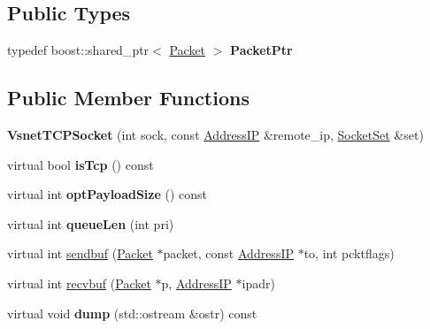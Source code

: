 \subsection*{Public Types}
\begin{DoxyCompactItemize}
\item 
typedef boost\+::shared\+\_\+ptr$<$ \hyperlink{classPacket}{Packet} $>$ {\bfseries Packet\+Ptr}\hypertarget{classVsnetTCPSocket_a0675de8ef365ec9824a113f0be24d33e}{}\label{classVsnetTCPSocket_a0675de8ef365ec9824a113f0be24d33e}

\end{DoxyCompactItemize}
\subsection*{Public Member Functions}
\begin{DoxyCompactItemize}
\item 
{\bfseries Vsnet\+T\+C\+P\+Socket} (int sock, const \hyperlink{structAddressIP}{Address\+IP} \&remote\+\_\+ip, \hyperlink{classSocketSet}{Socket\+Set} \&set)\hypertarget{classVsnetTCPSocket_a88c005d769650795cbcfed4b0e51eeae}{}\label{classVsnetTCPSocket_a88c005d769650795cbcfed4b0e51eeae}

\item 
virtual bool {\bfseries is\+Tcp} () const \hypertarget{classVsnetTCPSocket_aee136e93b688d938d1cb61f09a00802b}{}\label{classVsnetTCPSocket_aee136e93b688d938d1cb61f09a00802b}

\item 
virtual int {\bfseries opt\+Payload\+Size} () const \hypertarget{classVsnetTCPSocket_aeac9b2c2d9d3281dbd5814aecec804f1}{}\label{classVsnetTCPSocket_aeac9b2c2d9d3281dbd5814aecec804f1}

\item 
virtual int {\bfseries queue\+Len} (int pri)\hypertarget{classVsnetTCPSocket_ad20c822966a46ee7a111f766745a5b55}{}\label{classVsnetTCPSocket_ad20c822966a46ee7a111f766745a5b55}

\item 
virtual int \hyperlink{classVsnetTCPSocket_a7a123977fd7c62b152d3f95f950d6c69}{sendbuf} (\hyperlink{classPacket}{Packet} $\ast$packet, const \hyperlink{structAddressIP}{Address\+IP} $\ast$to, int pcktflags)
\item 
virtual int \hyperlink{classVsnetTCPSocket_a9dd7c50ffe1d6b53cb10a1ac5d35a544}{recvbuf} (\hyperlink{classPacket}{Packet} $\ast$p, \hyperlink{structAddressIP}{Address\+IP} $\ast$ipadr)
\item 
virtual void {\bfseries dump} (std\+::ostream \&ostr) const \hypertarget{classVsnetTCPSocket_a2f89fa7d6c7bff2a6c829bb19ceec7c1}{}\label{classVsnetTCPSocket_a2f89fa7d6c7bff2a6c829bb19ceec7c1}


\end{DoxyCompactItemize}
